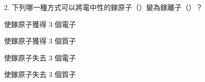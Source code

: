 \documentclass[12pt]{article}
\begin{document}
\begin{problem}
  \item[2.] 下列哪一種方式可以將電中性的鎵原子（）變為鎵離子（）？
  \begin{choices}
    \item 使鎵原子獲得 3 個電子
    \item 使鎵原子獲得 3 個質子
    \item 使鎵原子失去 3 個電子
    \item 使鎵原子失去 3 個質子
  \end{choices}
\end{problem}
\end{document}

